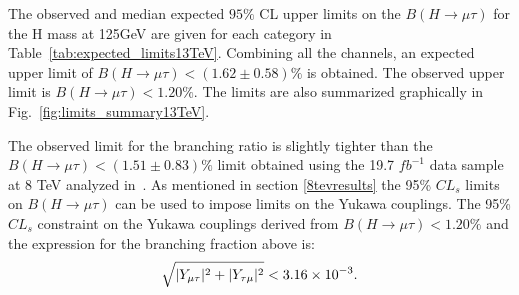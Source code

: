 \documentclass[oneside, letterpaper, oldfontcommands]{memoir}
\DeclarePairedDelimiter{\abs}{\lvert}{\rvert}
\begin{document}
The observed and median expected $95\%$ CL upper limits on the $B(H \rightarrow \mu \tau )$ for the H mass at 125GeV are given for each category
in Table~\ref{tab:expected_limits13TeV}.  Combining all
the channels, an expected upper limit of $B(H \rightarrow \mu \tau )<(1.62 \pm 0.58)\%$ is obtained.
The observed upper limit is $B(H \rightarrow \mu \tau ) < 1.20\%$.
The limits are also  summarized graphically  in
Fig.~\ref{fig:limits_summary13TeV}.

The observed limit for the branching ratio is slightly tighter than the $B(H \rightarrow \mu \tau )<(1.51 \pm 0.83)\%$ limit obtained using the 19.7 $fb^{-1}$ data sample at 8 TeV analyzed in~\cite{Khachatryan:2015kon}. As mentioned in section \ref{8tevresults} the 95\% $CL_{s}$ limits on $B(H\rightarrow\mu\tau)$ can be used to impose limits on the Yukawa couplings. The 95\% $CL_{s}$ constraint on the Yukawa couplings derived from $B(H \rightarrow \mu \tau )<1.20\%$ and the expression for the branching fraction above is:\begin{equation*}
\sqrt{\abs{Y_{\mu\tau}}^{2}+\abs{Y_{\tau\mu}}^{2}}<3.16\times 10^{-3}.
\end{equation*}
\end{document}
